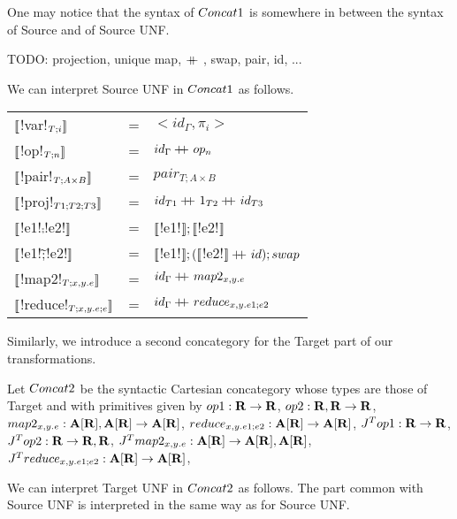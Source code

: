 One may notice that the syntax of $Concat1$ is somewhere in between the syntax of Source and of Source UNF.

\begin{notation}
    TODO: projection, unique map, $+\kern-1.3ex+\kern0.8ex$, swap, pair, id, ...
\end{notation}

We can interpret Source UNF in $Concat1$ as follows.

\begin{tabular}{l c l}
   $\llbracket$!var!$_{T;i} \rrbracket$ &=& $<id_\Gamma,\pi_i>$ \\
   $\llbracket$!op!$_{T;n} \rrbracket$ &=& $id_\Gamma+\kern-1.3ex+\kern0.8ex op_n$\\
   $\llbracket$!pair!$_{T;A\times B} \rrbracket$ &=& $pair_{T;A\times B}$ \\
   $\llbracket$!proj!$_{T1;T2;T3} \rrbracket$ &=& $id_{T1}+\kern-1.3ex+\kern0.8ex 1_{T2}+\kern-1.3ex+\kern0.8ex id_{T3}$\\
   $\llbracket$!e1!$\comp$!e2!$\rrbracket$  &=& $\llbracket$!e1!$\rrbracket ; \llbracket$!e2!$\rrbracket$ \\
   $\llbracket$!e1!$\widetilde{;}$!e2!$\rrbracket$ &=& $\llbracket$!e1!$\rrbracket ; (\llbracket$!e2!$\rrbracket+\kern-1.3ex+\kern0.8ex id ); swap$ \\
   $\llbracket$!map2!$_{T;x,y.e}\rrbracket$  &=& $id_\Gamma+\kern-1.3ex+\kern0.8ex map2_{x,y.e}$ \\
   $\llbracket$!reduce!$_{T;x,y.e;e}\rrbracket$ &=& $id_\Gamma+\kern-1.3ex+\kern0.8ex reduce_{x,y.e1;e2}$ \\
\end{tabular}

Similarly, we introduce a second concategory for the Target part of our transformations.

\begin{definition}[$\ConcatT$]
Let $\ConcatT$ be the syntactic Cartesian concategory whose types are those of Target and 
with primitives given by 
$op1: \mathbf{R} \to \mathbf{R}$, 
$op2: \mathbf{R},\mathbf{R} \to \mathbf{R}$, 
$map2_{x,y.e}: \mathbf{A}[\mathbf{R}],\mathbf{A}[\mathbf{R}]\to \mathbf{A}[\mathbf{R}]$, 
$reduce_{x,y.e1;e2}: \mathbf{A}[\mathbf{R}] \to \mathbf{A}[\mathbf{R}]$, 
$J^Top1: \mathbf{R} \to \mathbf{R}$, 
$J^Top2: \mathbf{R} \to \mathbf{R}, \mathbf{R}$, 
$J^Tmap2_{x,y.e}: \mathbf{A}[\mathbf{R}] \to \mathbf{A}[\mathbf{R}], \mathbf{A}[\mathbf{R}]$, 
$J^Treduce_{x,y.e1;e2}: \mathbf{A}[\mathbf{R}] \to \mathbf{A}[\mathbf{R}]$, 
\end{definition}

We can interpret Target UNF in $\ConcatT$ as follows. 
The part common with Source UNF is interpreted in the same way as for Source UNF.

